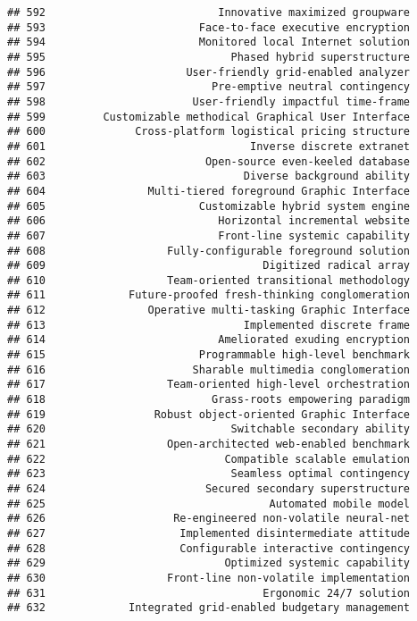 \documentclass[
]{article}
\begin{document}
\begin{verbatim}
## 592                           Innovative maximized groupware
## 593                        Face-to-face executive encryption
## 594                        Monitored local Internet solution
## 595                             Phased hybrid superstructure
## 596                      User-friendly grid-enabled analyzer
## 597                          Pre-emptive neutral contingency
## 598                       User-friendly impactful time-frame
## 599         Customizable methodical Graphical User Interface
## 600              Cross-platform logistical pricing structure
## 601                                Inverse discrete extranet
## 602                         Open-source even-keeled database
## 603                               Diverse background ability
## 604                Multi-tiered foreground Graphic Interface
## 605                        Customizable hybrid system engine
## 606                           Horizontal incremental website
## 607                           Front-line systemic capability
## 608                   Fully-configurable foreground solution
## 609                                  Digitized radical array
## 610                   Team-oriented transitional methodology
## 611             Future-proofed fresh-thinking conglomeration
## 612                Operative multi-tasking Graphic Interface
## 613                               Implemented discrete frame
## 614                           Ameliorated exuding encryption
## 615                        Programmable high-level benchmark
## 616                       Sharable multimedia conglomeration
## 617                   Team-oriented high-level orchestration
## 618                          Grass-roots empowering paradigm
## 619                 Robust object-oriented Graphic Interface
## 620                             Switchable secondary ability
## 621                   Open-architected web-enabled benchmark
## 622                            Compatible scalable emulation
## 623                             Seamless optimal contingency
## 624                         Secured secondary superstructure
## 625                                   Automated mobile model
## 626                    Re-engineered non-volatile neural-net
## 627                     Implemented disintermediate attitude
## 628                     Configurable interactive contingency
## 629                            Optimized systemic capability
## 630                   Front-line non-volatile implementation
## 631                                  Ergonomic 24/7 solution
## 632             Integrated grid-enabled budgetary management

\end{verbatim}
\end{document}
